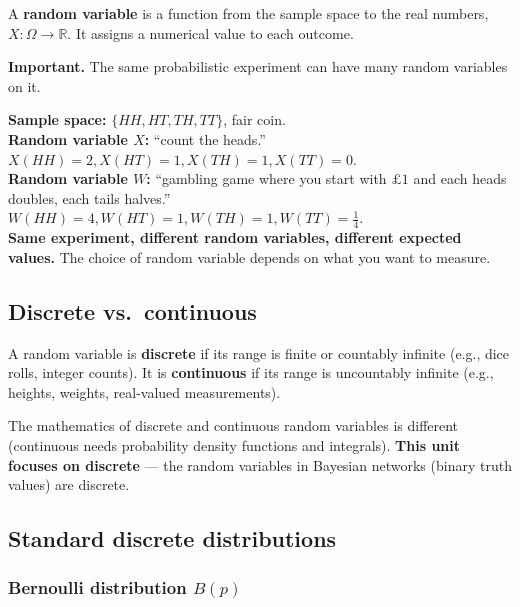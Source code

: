 \documentclass[11pt, a4paper]{article}
\begin{document}
\begin{defbox}
A \textbf{random variable} is a function from the sample space to the real numbers, $X : \Omega \to \mathbb{R}$. It assigns a numerical value to each outcome.
\end{defbox}

\textbf{Important.} The same probabilistic experiment can have many random variables on it.

\begin{exbox}
\textbf{Sample space:} $\{HH, HT, TH, TT\}$, fair coin.\\[0.3em]
\textbf{Random variable $X$:} ``count the heads.'' $X(HH) = 2, X(HT) = 1, X(TH) = 1, X(TT) = 0$.\\[0.3em]
\textbf{Random variable $W$:} ``gambling game where you start with $\pounds 1$ and each heads doubles, each tails halves.'' $W(HH) = 4, W(HT) = 1, W(TH) = 1, W(TT) = \frac{1}{4}$.\\[0.3em]
\textbf{Same experiment, different random variables, different expected values.} The choice of random variable depends on what you want to measure.
\end{exbox}

\subsection{Discrete vs.\ continuous}

\begin{defbox}
A random variable is \textbf{discrete} if its range is finite or countably infinite (e.g., dice rolls, integer counts). It is \textbf{continuous} if its range is uncountably infinite (e.g., heights, weights, real-valued measurements).
\end{defbox}

The mathematics of discrete and continuous random variables is different (continuous needs probability density functions and integrals). \textbf{This unit focuses on discrete} — the random variables in Bayesian networks (binary truth values) are discrete.

\subsection{Standard discrete distributions}

\subsubsection*{Bernoulli distribution $B(p)$}
\end{document}
